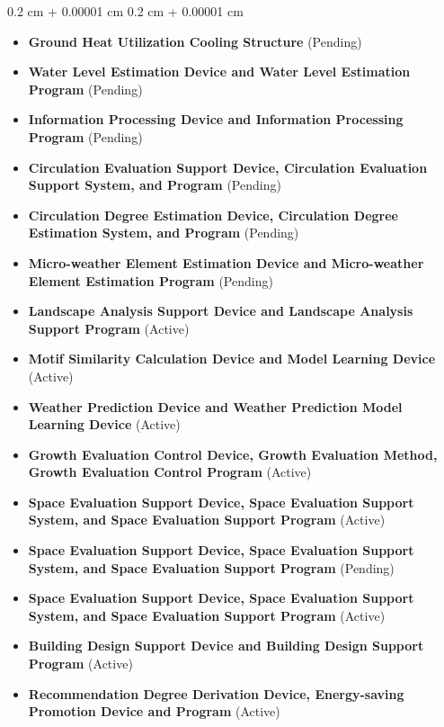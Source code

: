 \documentclass[10pt, letterpaper]{article}
\newenvironment{highlightsforbulletentries}{
    \begin{itemize}[
        topsep=0.10 cm,
        parsep=0.10 cm,
        partopsep=0pt,
        itemsep=0pt,
        leftmargin=10pt
    ]
}{
    \end{itemize}
} %
\newenvironment{onecolentry}{
    \begin{adjustwidth}{
        0.2 cm + 0.00001 cm
    }{
        0.2 cm + 0.00001 cm
    }
}{
    \end{adjustwidth}
} %
\begin{document}
    \begin{onecolentry}
        \begin{highlightsforbulletentries}
            \item \textbf{Ground Heat Utilization Cooling Structure} (Pending)
            \item \textbf{Water Level Estimation Device and Water Level Estimation Program} (Pending)
            \item \textbf{Information Processing Device and Information Processing Program} (Pending)
            \item \textbf{Circulation Evaluation Support Device, Circulation Evaluation Support System, and Program} (Pending)
            \item \textbf{Circulation Degree Estimation Device, Circulation Degree Estimation System, and Program} (Pending)
            \item \textbf{Micro-weather Element Estimation Device and Micro-weather Element Estimation Program} (Pending)
            \item \textbf{Landscape Analysis Support Device and Landscape Analysis Support Program} (Active)
            \item \textbf{Motif Similarity Calculation Device and Model Learning Device} (Active)
            \item \textbf{Weather Prediction Device and Weather Prediction Model Learning Device} (Active)
            \item \textbf{Growth Evaluation Control Device, Growth Evaluation Method, Growth Evaluation Control Program} (Active)
            \item \textbf{Space Evaluation Support Device, Space Evaluation Support System, and Space Evaluation Support Program} (Active)
            \item \textbf{Space Evaluation Support Device, Space Evaluation Support System, and Space Evaluation Support Program} (Pending)
            \item \textbf{Space Evaluation Support Device, Space Evaluation Support System, and Space Evaluation Support Program} (Active)
            \item \textbf{Building Design Support Device and Building Design Support Program} (Active)
            \item \textbf{Recommendation Degree Derivation Device, Energy-saving Promotion Device and Program} (Active)
        \end{highlightsforbulletentries}
    \end{onecolentry}
\end{document}
